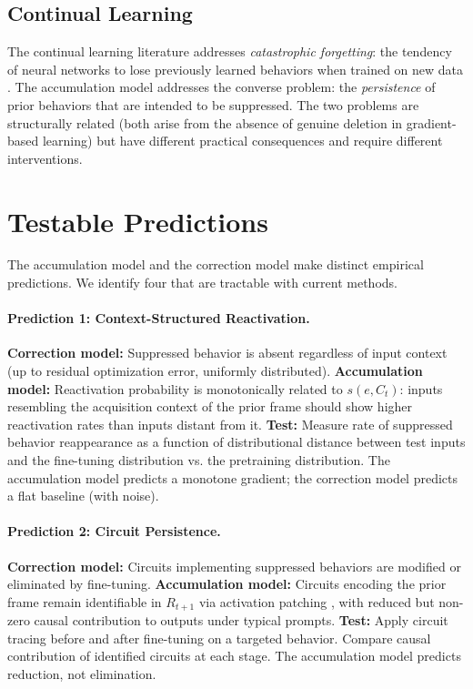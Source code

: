 \documentclass[12pt]{article}
\begin{document}
\subsection{Continual Learning}

The continual learning literature addresses \emph{catastrophic
forgetting}: the tendency of neural networks to lose previously
learned behaviors when trained on new data
\cite{kirkpatrick2017overcoming}.
The accumulation model addresses the converse problem: the
\emph{persistence} of prior behaviors that are intended to be
suppressed.
The two problems are structurally related (both arise from the
absence of genuine deletion in gradient-based learning) but have
different practical consequences and require different
interventions.

\section{Testable Predictions}
\label{sec:predictions}

The accumulation model and the correction model make distinct
empirical predictions.
We identify four that are tractable with current methods.

\paragraph{Prediction 1: Context-Structured Reactivation.}
\textbf{Correction model:} Suppressed behavior is absent regardless
of input context (up to residual optimization error, uniformly
distributed).
\textbf{Accumulation model:} Reactivation probability is
monotonically related to $s(e, C_t)$: inputs resembling the
acquisition context of the prior frame should show higher
reactivation rates than inputs distant from it.
\textbf{Test:} Measure rate of suppressed behavior reappearance
as a function of distributional distance between test inputs
and the fine-tuning distribution vs. the pretraining distribution.
The accumulation model predicts a monotone gradient; the correction
model predicts a flat baseline (with noise).

\paragraph{Prediction 2: Circuit Persistence.}
\textbf{Correction model:} Circuits implementing suppressed behaviors
are modified or eliminated by fine-tuning.
\textbf{Accumulation model:} Circuits encoding the prior frame
remain identifiable in $R_{t+1}$ via activation patching
\cite{conmy2023towards}, with reduced but non-zero causal
contribution to outputs under typical prompts.
\textbf{Test:} Apply circuit tracing before and after fine-tuning
on a targeted behavior.
Compare causal contribution of identified circuits at each stage.
The accumulation model predicts reduction, not elimination.
\end{document}
